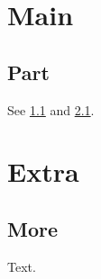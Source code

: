 \documentclass{article}
\begin{document}
\section{Main}
\subsection{Part}\label{p}
See \ref{p} and \ref{q}.
\appendix
\section{Extra}
\subsection{More}\label{q}
Text.
\end{document}
